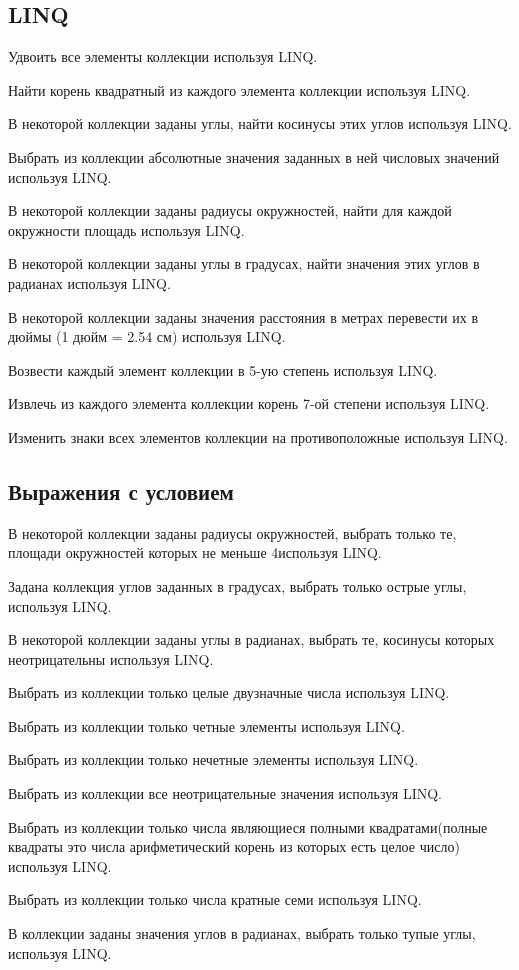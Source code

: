 \subsection{LINQ}

\task Удвоить все элементы коллекции используя LINQ.

\task Найти корень квадратный из каждого элемента коллекции используя
LINQ.

\task В некоторой коллекции заданы углы, найти косинусы этих углов
используя LINQ.

\task Выбрать из коллекции абсолютные значения заданных в ней числовых
значений используя LINQ.

\task В некоторой коллекции заданы радиусы окружностей, найти для
каждой окружности площадь используя LINQ.

\task В некоторой коллекции заданы углы в градусах, найти значения
этих углов в радианах используя LINQ.

\task В некоторой коллекции заданы значения расстояния в метрах
перевести их в дюймы (1 дюйм = 2.54 см) используя LINQ.

\task Возвести каждый элемент коллекции в 5-ую степень используя LINQ.

\task Извлечь из каждого элемента коллекции корень 7-ой степени
используя LINQ.

\task Изменить знаки всех элементов коллекции на противоположные
используя LINQ.


\subsection{Выражения с условием}

\task В некоторой коллекции заданы радиусы окружностей, выбрать только
те, площади окружностей которых не меньше 4используя LINQ.

\task Задана коллекция углов заданных в градусах, выбрать только
острые углы, используя LINQ.

\task В некоторой коллекции заданы углы в радианах, выбрать те,
косинусы которых неотрицательны используя LINQ.

\task Выбрать из коллекции только целые двузначные числа используя
LINQ.

\task Выбрать из коллекции только четные элементы используя LINQ.

\task Выбрать из коллекции только нечетные элементы используя LINQ.

\task Выбрать из коллекции все неотрицательные значения используя
LINQ.

\task Выбрать из коллекции только числа являющиеся полными
квадратами(полные квадраты это числа арифметический корень из которых
есть целое число) используя LINQ.

\task Выбрать из коллекции только числа кратные семи используя LINQ.

\task В коллекции заданы значения углов в радианах, выбрать только
тупые углы, используя LINQ.
